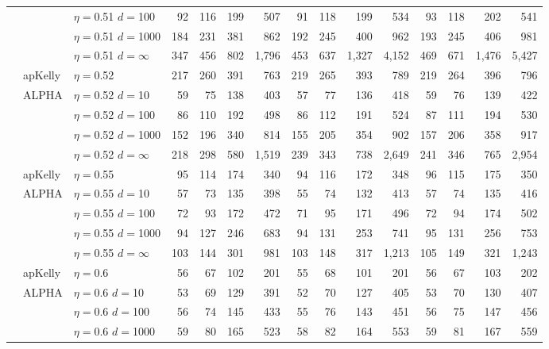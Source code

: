 \documentclass[aoas]{imsart}
\begin{document}
\begin{table}
\begin{tabular}{lll|rrrr|rrrr|rrrr}
&  & $\eta=$0.51 $d=$100 & 92  & 116  & 199  & 507  & 91  & 118  & 199  & 534  & 93  & 118  & 202  & 541  \\
&  & $\eta=$0.51 $d=$1000 & 184  & 231  & 381  & 862  & 192  & 245  & 400  & 962  & 193  & 245  & 406  & 981  \\
 &  & $\eta=$0.51 $d=\infty$ & 347  & 456  & 802  & 1,796  & 453  & 637  & 1,327  & 4,152  & 469  & 671  & 1,476  & 5,427  \\
\cline{2-15} & apKelly & $\eta=$0.52 & 217  & 260  & 391  & 763  & 219  & 265  & 393  & 789  & 219  & 264  & 396  & 796  \\
\cline{2-15}
& ALPHA & $\eta=$0.52 $d=$10 & 59  & 75  & 138  & 403  & 57  & 77  & 136  & 418  & 59  & 76  & 139  & 422  \\
&  & $\eta=$0.52 $d=$100 & 86  & 110  & 192  & 498  & 86  & 112  & 191  & 524  & 87  & 111  & 194  & 530  \\
&  & $\eta=$0.52 $d=$1000 & 152  & 196  & 340  & 814  & 155  & 205  & 354  & 902  & 157  & 206  & 358  & 917  \\
 &  & $\eta=$0.52 $d=\infty$ & 218  & 298  & 580  & 1,519  & 239  & 343  & 738  & 2,649  & 241  & 346  & 765  & 2,954  \\
\cline{2-15} & apKelly & $\eta=$0.55 & 95  & 114  & 174  & 340  & 94  & 116  & 172  & 348  & 96  & 115  & 175  & 350  \\
\cline{2-15}
& ALPHA & $\eta=$0.55 $d=$10 & 57  & 73  & 135  & 398  & 55  & 74  & 132  & 413  & 57  & 74  & 135  & 416  \\
&  & $\eta=$0.55 $d=$100 & 72  & 93  & 172  & 472  & 71  & 95  & 171  & 496  & 72  & 94  & 174  & 502  \\
&  & $\eta=$0.55 $d=$1000 & 94  & 127  & 246  & 683  & 94  & 131  & 253  & 741  & 95  & 131  & 256  & 753  \\
 &  & $\eta=$0.55 $d=\infty$ & 103  & 144  & 301  & 981  & 103  & 148  & 317  & 1,213  & 105  & 149  & 321  & 1,243  \\
\cline{2-15} & apKelly & $\eta=$0.6 & 56  & 67  & 102  & 201  & 55  & 68  & 101  & 201  & 56  & 67  & 103  & 202  \\
\cline{2-15}
& ALPHA & $\eta=$0.6 $d=$10 & 53  & 69  & 129  & 391  & 52  & 70  & 127  & 405  & 53  & 70  & 130  & 407  \\
&  & $\eta=$0.6 $d=$100 & 56  & 74  & 145  & 433  & 55  & 76  & 143  & 451  & 56  & 75  & 147  & 456  \\
&  & $\eta=$0.6 $d=$1000 & 59  & 80  & 165  & 523  & 58  & 82  & 164  & 553  & 59  & 81  & 167  & 559  \\

\end{tabular}
\end{table}
\end{document}
